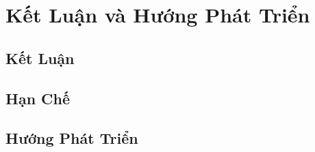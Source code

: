 ﻿\chapter{Kết Luận và Hướng Phát Triển}
\label{chap:conclude}
\section{Kết Luận}
\section{Hạn Chế}
\section{Hướng Phát Triển}
